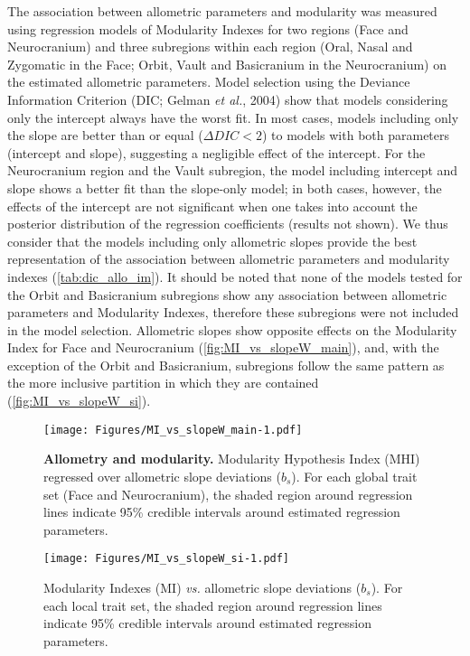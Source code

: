 \documentclass[12pt,twoside]{report}
\begin{document}
The association between allometric parameters and modularity was
measured using regression models of Modularity Indexes for two regions
(Face and Neurocranium) and three subregions within each region (Oral,
Nasal and Zygomatic in the Face; Orbit, Vault and Basicranium in the
Neurocranium) on the estimated allometric parameters. Model selection
using the Deviance Information Criterion (DIC; Gelman \emph{et al.},
2004) show that models considering only the intercept always have the
worst fit. In most cases, models including only the slope are better
than or equal ($\Delta DIC < 2$) to models with both parameters
(intercept and slope), suggesting a negligible effect of the intercept.
For the Neurocranium region and the Vault subregion, the model including
intercept and slope shows a better fit than the slope-only model; in
both cases, however, the effects of the intercept are not significant
when one takes into account the posterior distribution of the regression
coefficients (results not shown). We thus consider that the models
including only allometric slopes provide the best representation of the
association between allometric parameters and modularity indexes
(\autoref{tab:dic_allo_im}). It should be noted that none of the models
tested for the Orbit and Basicranium subregions show any association
between allometric parameters and Modularity Indexes, therefore these
subregions were not included in the model selection. Allometric slopes
show opposite effects on the Modularity Index for Face and Neurocranium
(\autoref{fig:MI_vs_slopeW_main}), and, with the exception of the Orbit
and Basicranium, subregions follow the same pattern as the more
inclusive partition in which they are contained
(\autoref{fig:MI_vs_slopeW_si}).



\begin{figure}[htbp]
\centering
\texttt{[image: Figures/MI\_vs\_slopeW\_main-1.pdf]}
\caption{\textbf{Allometry and modularity.} Modularity Hypothesis Index
(MHI) regressed over allometric slope deviations ($b_s$). For each
global trait set (Face and Neurocranium), the shaded region around
regression lines indicate 95\% credible intervals around estimated
regression parameters. \label{fig:MI_vs_slopeW_main}}
\end{figure}

\begin{figure}[htbp]
\centering
\texttt{[image: Figures/MI\_vs\_slopeW\_si-1.pdf]}
\caption{Modularity Indexes (MI) \emph{vs.} allometric slope deviations
($b_s$). For each local trait set, the shaded region around regression
lines indicate 95\% credible intervals around estimated regression
parameters. \label{fig:MI_vs_slopeW_si}}
\end{figure}
\end{document}
